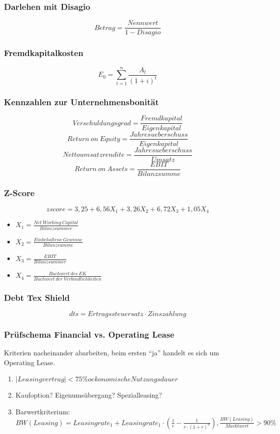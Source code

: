 \subsubsection{Darlehen mit Disagio}
\[Betrag = \frac{Nennwert}{1 - Disagio}\]

\subsubsection{Fremdkapitalkosten}
\[E_0 = \sum_{t=1}^{n} \frac{A_t}{(1+i)^t}\]

\subsubsection{Kennzahlen zur Unternehmensbonität}
\[Verschuldungsgrad = \frac{Fremdkapital}{Eigenkapital}\]
\[Return~on~Equity = \frac{Jahresueberschuss}{Eigenkapital}\]
\[Nettoumsatzrendite = \frac{Jahresueberschuss}{Umsatz}\]
\[Return~on~Assets = \frac{EBIT}{Bilanzsumme}\]

\subsubsection{Z-Score}
\[zscore = 3,25 + 6,56X_1 + 3,26X_2 + 6,72X_3 + 1,05X_4\]
\begin{itemize}
	\item \(X_1 = \frac{Net~Working~Capital}{Bilanzsummer}\)
	\item \(X_2 = \frac{Einbehaltene~Gewinne}{Bilanzsumme}\)
	\item \(X_3 = \frac{EBIT}{Bilanzsummer}\)
	\item \(X_4 = \frac{Buchwert~des~EK}{Buchwert~der~Verbindlichkeiten}\)
\end{itemize}

\subsubsection{Debt Tex Shield}
\[dts = Ertragssteuersatz \cdot Zinszahlung\]

\subsubsection{Prüfschema Financial vs. Operating Lease}
Kriterien nacheinander abarbeiten, beim ersten "`ja"' handelt es sich um Operating Lease.
\begin{enumerate}
	\item \(|Leasingvertrag| < 75\% oekonomische Nutzungsdauer\)
	\item Kaufoption? Eigenumsübergang? Spezialleasing?
	\item Barwertkriterium: \(BW(Leasing) = Leasingrate_1 + Leasingrate_1 \cdot (\frac{1}{r} - \frac{1}{r \cdot (1+r)^n}), \frac{BW(Leasing)}{Marktwert} > 90\%\) 
\end{enumerate}


